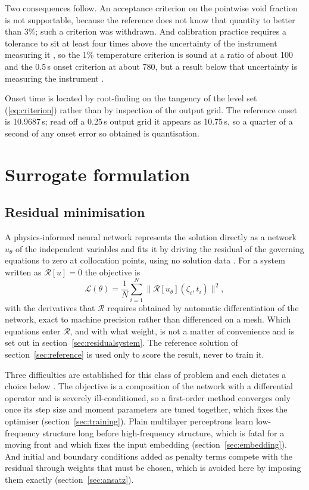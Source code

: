 \documentclass[11pt,a4paper]{article}
\begin{document}
Two consequences follow. An acceptance criterion on the pointwise void fraction is not
supportable, because the reference does not know that quantity to better than 3\%; such a
criterion was withdrawn. And calibration practice requires a tolerance to sit at least four
times above the uncertainty of the instrument measuring it \cite{nist}, so the 1\%
temperature criterion is sound at a ratio of about 100 and the 0.5\,s onset criterion at
about 780, but a result below that uncertainty is measuring the instrument
\cite{jakeman}.

Onset time is located by root-finding on the tangency of the level set
(\ref{eq:criterion}) rather than by inspection of the output grid. The reference onset is
10.9687\,s; read off a 0.25\,s output grid it appears as 10.75\,s, so a quarter of a second
of any onset error so obtained is quantisation.

\section{Surrogate formulation}\label{sec:method}

\subsection{Residual minimisation}

A physics-informed neural network represents the solution directly as a network $u_\theta$
of the independent variables and fits it by driving the residual of the governing equations
to zero at collocation points, using no solution data \cite{raissi,karniadakis}. For a
system written as $\mathcal{R}[u] = 0$ the objective is
\begin{equation}\label{eq:pinnloss}
\mathcal{L}(\theta) = \frac{1}{N}\sum_{i=1}^{N}
\bigl\lVert \mathcal{R}[u_\theta](\zeta_i, t_i)\bigr\rVert^2 ,
\end{equation}
with the derivatives that $\mathcal{R}$ requires obtained by automatic differentiation of
the network, exact to machine precision rather than differenced on a mesh. Which equations
enter $\mathcal{R}$, and with what weight, is not a matter of convenience and is set out in
section~\ref{sec:residualsystem}. The reference solution of section~\ref{sec:reference} is
used only to score the result, never to train it.

Three difficulties are established for this class of problem and each dictates a choice
below \cite{krishnapriyan}. The objective is a composition of the network with a
differential operator and is severely ill-conditioned, so a first-order method converges
only once its step size and moment parameters are tuned together, which fixes the optimiser
(section~\ref{sec:training}). Plain multilayer perceptrons learn low-frequency structure
long before high-frequency structure, which is fatal for a moving front and which fixes the
input embedding (section~\ref{sec:embedding}). And initial and boundary conditions added as
penalty terms compete with the residual through weights that must be chosen, which is
avoided here by imposing them exactly (section~\ref{sec:ansatz}).
\end{document}
